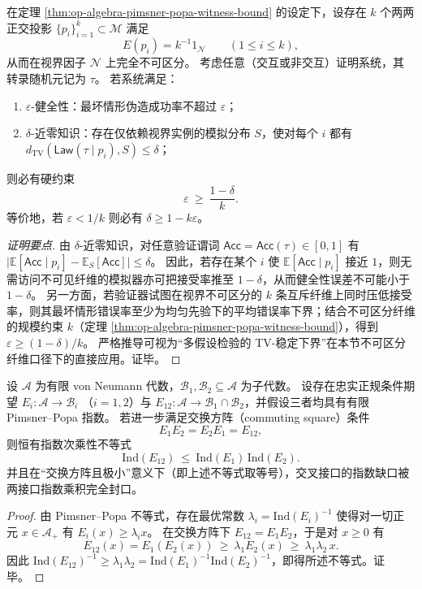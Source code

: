 \begin{corollary}\label{cor:op-algebra-nearzk-soundness-fiber-tradeoff}
在定理 \ref{thm:op-algebra-pimsner-popa-witness-bound} 的设定下，设存在 \(k\) 个两两正交投影 \(\{p_i\}_{i=1}^k\subset\mathcal{M}\) 满足
\[
E(p_i)=k^{-1}1_{\mathcal{N}}\qquad(1\le i\le k),
\]
从而在视界因子 \(\mathcal{N}\) 上完全不可区分。
考虑任意（交互或非交互）证明系统，其转录随机元记为 \(\tau\)。
若系统满足：
\begin{enumerate}
  \item \(\varepsilon\)-健全性：最坏情形伪造成功率不超过 \(\varepsilon\)；
  \item \(\delta\)-近零知识：存在仅依赖视界实例的模拟分布 \(S\)，使对每个 \(i\) 都有
  \(d_{\mathrm{TV}}(\mathsf{Law}(\tau\mid p_i),S)\le \delta\)；
\end{enumerate}
则必有硬约束
\[
\boxed{\;\varepsilon\ \ge\ \frac{1-\delta}{k}.\;}
\]
等价地，若 \(\varepsilon<1/k\) 则必有 \(\delta\ge 1-k\varepsilon\)。
\end{corollary}
\begin{proof}[证明要点]
由 \(\delta\)-近零知识，对任意验证谓词 \(\mathsf{Acc}=\mathsf{Acc}(\tau)\in[0,1]\) 有
\(
\bigl|\mathbb{E}[\mathsf{Acc}\mid p_i]-\mathbb{E}_S[\mathsf{Acc}]\bigr|\le \delta
\)。
因此，若存在某个 \(i\) 使 \(\mathbb{E}[\mathsf{Acc}\mid p_i]\) 接近 \(1\)，则无需访问不可见纤维的模拟器亦可把接受率推至 \(1-\delta\)，从而健全性误差不可能小于 \(1-\delta\)。
另一方面，若验证器试图在视界不可区分的 \(k\) 条互斥纤维上同时压低接受率，则其最坏情形错误率至少为均匀先验下的平均错误率下界；结合不可区分纤维的规模约束 \(k\)（定理 \ref{thm:op-algebra-pimsner-popa-witness-bound}），得到 \(\varepsilon\ge(1-\delta)/k\)。
严格推导可视为“多假设检验的 TV-稳定下界”在本节不可区分纤维口径下的直接应用。证毕。
\end{proof}

\begin{proposition}\label{prop:op-algebra-index-submultiplicativity-commuting-square}
设 \(\mathcal{A}\) 为有限 von Neumann 代数，\(\mathcal{B}_1,\mathcal{B}_2\subseteq\mathcal{A}\) 为子代数。
设存在忠实正规条件期望
\(
E_i:\mathcal{A}\to\mathcal{B}_i
\)
（\(i=1,2\)）与
\(
E_{12}:\mathcal{A}\to\mathcal{B}_1\cap\mathcal{B}_2
\)，并假设三者均具有有限 Pimsner--Popa 指数。
若进一步满足交换方阵（commuting square）条件
\[
\boxed{\;E_1E_2=E_2E_1=E_{12},\;}
\]
则恒有指数次乘性不等式
\[
\boxed{\;\mathrm{Ind}(E_{12})\ \le\ \mathrm{Ind}(E_1)\,\mathrm{Ind}(E_2).\;}
\]
并且在“交换方阵且极小”意义下（即上述不等式取等号），交叉接口的指数缺口被两接口指数乘积完全封口。
\end{proposition}
\begin{proof}
由 Pimsner--Popa 不等式，存在最优常数 \(\lambda_i=\mathrm{Ind}(E_i)^{-1}\) 使得对一切正元 \(x\in\mathcal{A}_+\) 有 \(E_i(x)\ge \lambda_i x\)。
在交换方阵下 \(E_{12}=E_1E_2\)，于是对 \(x\ge 0\) 有
\[
E_{12}(x)=E_1(E_2(x))\ \ge\ \lambda_1E_2(x)\ \ge\ \lambda_1\lambda_2\,x.
\]
因此 \(\mathrm{Ind}(E_{12})^{-1}\ge \lambda_1\lambda_2=\mathrm{Ind}(E_1)^{-1}\mathrm{Ind}(E_2)^{-1}\)，即得所述不等式。证毕。
\end{proof}

